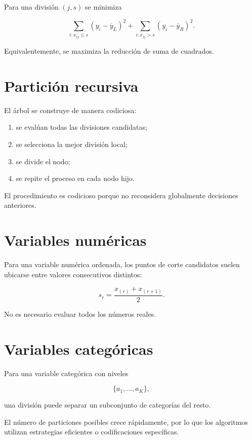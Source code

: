 \documentclass[
  spanish,
  11pt,
  letterpaper,
  DIV=11,
  numbers=noendperiod]{scrreprt}
\providecommand{\tightlist}{%
  \setlength{\itemsep}{0pt}\setlength{\parskip}{0pt}}
\theoremstyle{definition}
\theoremstyle{plain}
\theoremstyle{definition}
\theoremstyle{remark}
\begin{document}
Para una división \((j,s)\) se minimiza

\[
\sum_{i:x_{ij}\leq s}
\left(
y_i-\overline{y}_L
\right)^2
+
\sum_{i:x_{ij}>s}
\left(
y_i-\overline{y}_R
\right)^2.
\]

Equivalentemente, se maximiza la reducción de suma de cuadrados.

\section{Partición recursiva}\label{particiuxf3n-recursiva}

El árbol se construye de manera codiciosa:

\begin{enumerate}
\def\labelenumi{\arabic{enumi}.}
\tightlist
\item
  se evalúan todas las divisiones candidatas;
\item
  se selecciona la mejor división local;
\item
  se divide el nodo;
\item
  se repite el proceso en cada nodo hijo.
\end{enumerate}

El procedimiento es codicioso porque no reconsidera globalmente
decisiones anteriores.

\section{Variables numéricas}\label{variables-numuxe9ricas}

Para una variable numérica ordenada, los puntos de corte candidatos
suelen ubicarse entre valores consecutivos distintos:

\[
s_r
=
\frac{x_{(r)}+x_{(r+1)}}{2}.
\]

No es necesario evaluar todos los números reales.

\section{Variables categóricas}\label{variables-categuxf3ricas-2}

Para una variable categórica con niveles

\[
\{a_1,\ldots,a_K\},
\]

una división puede separar un subconjunto de categorías del resto.

El número de particiones posibles crece rápidamente, por lo que los
algoritmos utilizan estrategias eficientes o codificaciones específicas.
\end{document}
